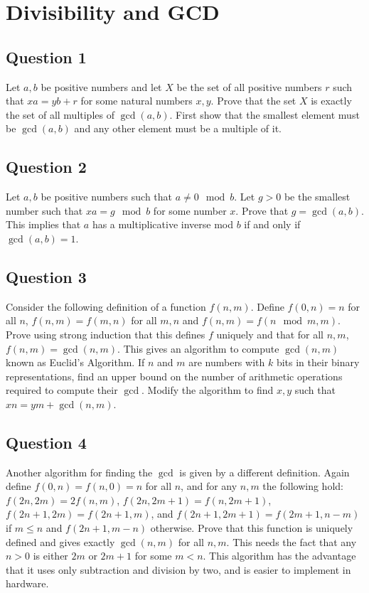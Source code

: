 \documentclass[12pt]{report}
\begin{document}
\chapter{Divisibility and GCD}
\section*{Question 1}
Let $a, b$ be positive numbers and let $X$ be the set of all positive numbers $r$ such that $xa = yb + r$ for some natural numbers $x, y$. Prove that the set $X$ is exactly the set of all multiples of $\gcd(a, b)$. First show that the smallest element must be $\gcd(a, b)$ and any other element must be a multiple of it.
\section*{Question 2}
Let $a, b$ be positive numbers such that $a \neq 0 \mod b$. Let $g > 0$ be the smallest number such that $xa = g \mod b$ for some number $x$. Prove that $g = \gcd(a, b)$. This implies that $a$ has a multiplicative inverse mod $b$ if and only if $\gcd(a, b) = 1$.
\section*{Question 3}
Consider the following definition of a function $f(n, m)$. Define $f(0, n) = n$ for all $n$, $f(n, m) = f(m, n)$ for all $m, n$ and $f(n, m) = f(n \mod m, m)$. Prove using strong induction that this defines $f$ uniquely and that for all $n, m$, $f(n, m) = \gcd(n, m)$. This gives an algorithm to compute $\gcd(n, m)$ known as Euclid's Algorithm. If $n$ and $m$ are numbers with $k$ bits in their binary representations, find an upper bound on the number of arithmetic operations required to compute their $\gcd$. Modify the algorithm to find $x, y$ such that $xn = ym + \gcd(n, m)$.
\section*{Question 4}
Another algorithm for finding the $\gcd$ is given by a different definition. Again define $f(0, n) = f(n, 0) = n$ for all $n$, and for any $n, m$ the following hold: $f(2n, 2m) = 2f(n, m)$, $f(2n, 2m + 1) = f(n, 2m + 1)$, $f(2n + 1, 2m) = f(2n + 1, m)$, and $f(2n + 1, 2m + 1) = f(2m + 1, n - m)$ if $m \leq n$ and $f(2n + 1, m - n)$ otherwise. Prove that this function is uniquely defined and gives exactly $\gcd(n, m)$ for all $n, m$. This needs the fact that any $n > 0$ is either $2m$ or $2m + 1$ for some $m < n$. This algorithm has the advantage that it uses only subtraction and division by two, and is easier to implement in hardware.
\end{document}
